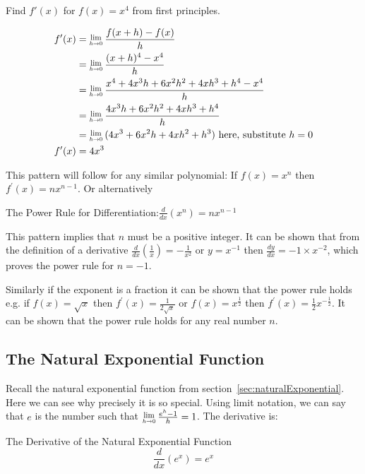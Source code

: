 \example Find $f'(x)$ for $f (x) =x^{4}$ from first principles.

\solution \begin{align*}f^{ \prime } (x) &  = \Lim{h\to 0}\frac{f (x +h) -f (x)}{h} \\
 &  = \Lim{h\to 0}\frac{(x +h)^{4} -x^{4}}{h} \\
 &  = \Lim{h\to 0}\frac{x^{4} +4 x^{3} h +6 x^{2} h^{2} +4 x h^{3} +h^{4} -x^{4}}{h} \\
 &  = \Lim{h\to 0}\frac{4 x^{3} h +6 x^{2} h^{2} +4 x h^{3} +h^{4}}{h} \\
 &  = \Lim{h\to 0}(4 x^{3} +6 x^{2} h +4 x h^{2} +h^{3})\text{ here, substitute }h=0 \\
 f'(x)&  = 4 x^{3}\end{align*}

This pattern will follow for any similar polynomial: If $f (x) =x^{n}$ then $f^{ \prime } (x) =n x^{n -1}$. Or alternatively 
\begin{tcolorbox}
The Power Rule for Differentiation:\qquad$\displaystyle \frac{d}{d x} (x^{n}) =n x^{n -1}$
\end{tcolorbox}
	
This pattern implies that $n$ must be a positive integer. It can be shown that from the definition of a derivative $\frac{d}{d x} \genfrac{(}{)}{}{}{1}{x} = -\frac{1}{x^{2}}$ or $y =x^{ -1}$ then $\frac{d y}{d x} = -1 \times x^{ -2}$, which proves the power rule for $n = -1$. 

Similarly if the exponent is a fraction it can be shown that the power rule holds e.g. if $f (x) =\sqrt{x}$ then $f^{ \prime } (x) =\frac{1}{2 \sqrt{x}}$ or $f (x) =x^{\frac{1}{2}}$ then $f^{ \prime } (x) =\frac{1}{2} x^{ -\frac{1}{2}}$. It can be shown that the power rule holds for any real number $n$. 

\subsection*{The Natural Exponential Function}
Recall the natural exponential function from section~\ref{sec:naturalExponential}. Here we can see why precisely it is so special. Using limit notation, we can say that $e$ is the number such that $\Lim{h\to 0}\frac{e^{h} -1}{h} =1$. The derivative is:

\begin{tcolorbox}
The Derivative of the Natural Exponential Function
$$\frac{d}{d x} \left (e^{x}\right ) =e^{x}$$
\end{tcolorbox}

